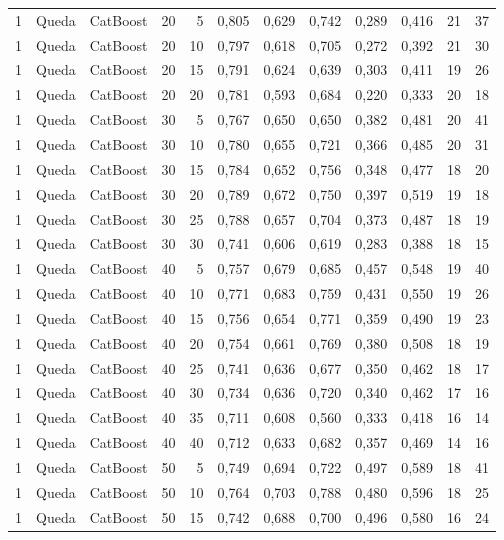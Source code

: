 \begin{longtable}{@{}rllrrrrrrrrr@{}}
1 & Queda & CatBoost & 20 & 5 & 0,805 & 0,629 & 0,742 & 0,289 & 0,416 & 21 & 37 \\
1 & Queda & CatBoost & 20 & 10 & 0,797 & 0,618 & 0,705 & 0,272 & 0,392 & 21 & 30 \\
1 & Queda & CatBoost & 20 & 15 & 0,791 & 0,624 & 0,639 & 0,303 & 0,411 & 19 & 26 \\
1 & Queda & CatBoost & 20 & 20 & 0,781 & 0,593 & 0,684 & 0,220 & 0,333 & 20 & 18 \\
1 & Queda & CatBoost & 30 & 5 & 0,767 & 0,650 & 0,650 & 0,382 & 0,481 & 20 & 41 \\
1 & Queda & CatBoost & 30 & 10 & 0,780 & 0,655 & 0,721 & 0,366 & 0,485 & 20 & 31 \\
1 & Queda & CatBoost & 30 & 15 & 0,784 & 0,652 & 0,756 & 0,348 & 0,477 & 18 & 20 \\
1 & Queda & CatBoost & 30 & 20 & 0,789 & 0,672 & 0,750 & 0,397 & 0,519 & 19 & 18 \\
1 & Queda & CatBoost & 30 & 25 & 0,788 & 0,657 & 0,704 & 0,373 & 0,487 & 18 & 19 \\
1 & Queda & CatBoost & 30 & 30 & 0,741 & 0,606 & 0,619 & 0,283 & 0,388 & 18 & 15 \\
1 & Queda & CatBoost & 40 & 5 & 0,757 & 0,679 & 0,685 & 0,457 & 0,548 & 19 & 40 \\
1 & Queda & CatBoost & 40 & 10 & 0,771 & 0,683 & 0,759 & 0,431 & 0,550 & 19 & 26 \\
1 & Queda & CatBoost & 40 & 15 & 0,756 & 0,654 & 0,771 & 0,359 & 0,490 & 19 & 23 \\
1 & Queda & CatBoost & 40 & 20 & 0,754 & 0,661 & 0,769 & 0,380 & 0,508 & 18 & 19 \\
1 & Queda & CatBoost & 40 & 25 & 0,741 & 0,636 & 0,677 & 0,350 & 0,462 & 18 & 17 \\
1 & Queda & CatBoost & 40 & 30 & 0,734 & 0,636 & 0,720 & 0,340 & 0,462 & 17 & 16 \\
1 & Queda & CatBoost & 40 & 35 & 0,711 & 0,608 & 0,560 & 0,333 & 0,418 & 16 & 14 \\
1 & Queda & CatBoost & 40 & 40 & 0,712 & 0,633 & 0,682 & 0,357 & 0,469 & 14 & 16 \\
1 & Queda & CatBoost & 50 & 5 & 0,749 & 0,694 & 0,722 & 0,497 & 0,589 & 18 & 41 \\
1 & Queda & CatBoost & 50 & 10 & 0,764 & 0,703 & 0,788 & 0,480 & 0,596 & 18 & 25 \\
1 & Queda & CatBoost & 50 & 15 & 0,742 & 0,688 & 0,700 & 0,496 & 0,580 & 16 & 24 \\

\end{longtable}
